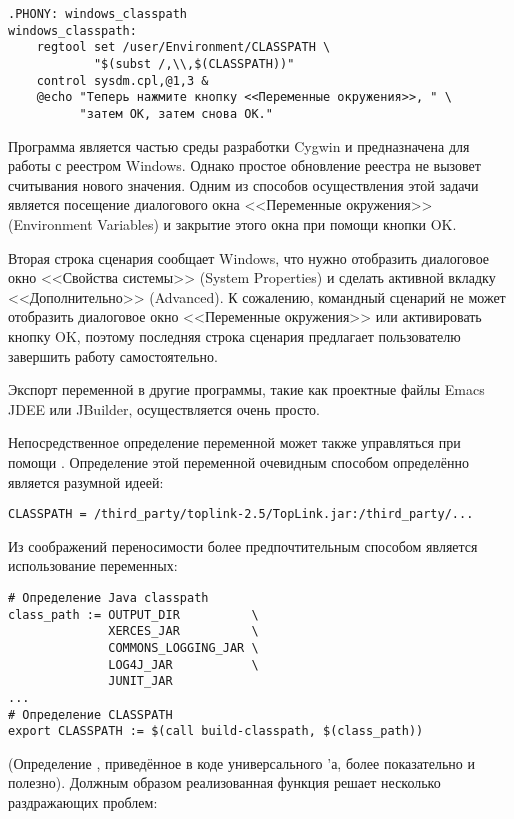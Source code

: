 {\footnotesize
\begin{verbatim}
.PHONY: windows_classpath
windows_classpath:
    regtool set /user/Environment/CLASSPATH \
	        "$(subst /,\\,$(CLASSPATH))"
    control sysdm.cpl,@1,3 &
    @echo "Теперь нажмите кнопку <<Переменные окружения>>, " \
	      "затем OK, затем снова OK."
\end{verbatim}
}

Программа  является частью среды разработки Cygwin и
предназначена для работы с реестром Windows. Однако простое обновление
реестра не вызовет считывания нового значения. Одним из способов
осуществления этой задачи является посещение диалогового окна
<<Переменные окружения>> (Environment Variables) и закрытие этого
окна при помощи кнопки OK.

Вторая строка сценария сообщает Windows, что нужно отобразить
диалоговое окно <<Свойства системы>> (System Properties) и сделать
активной вкладку <<Дополнительно>> (Advanced). К сожалению, командный
сценарий не может отобразить диалоговое окно <<Переменные окружения>>
или активировать кнопку OK, поэтому последняя строка сценария
предлагает пользователю завершить работу самостоятельно.

Экспорт переменной  в другие программы, такие как
проектные файлы Emacs JDEE или JBuilder, осуществляется очень просто.

Непосредственное определение переменной \variable{CLASSPATH} может
также управляться при помощи \GNUmake{}. Определение этой переменной
очевидным способом определённо является разумной идеей:

{\footnotesize
\begin{verbatim}
CLASSPATH = /third_party/toplink-2.5/TopLink.jar:/third_party/...
\end{verbatim}
}

Из соображений переносимости более предпочтительным способом является
использование переменных:

{\footnotesize
\begin{verbatim}
# Определение Java classpath
class_path := OUTPUT_DIR          \
              XERCES_JAR          \
              COMMONS_LOGGING_JAR \
              LOG4J_JAR           \
              JUNIT_JAR
...
# Определение CLASSPATH
export CLASSPATH := $(call build-classpath, $(class_path))
\end{verbatim}
}
(Определение , приведённое в коде универсального
\Makefile{}'а, более показательно и полезно). Должным образом
реализованная функция  решает несколько
раздражающих проблем:


